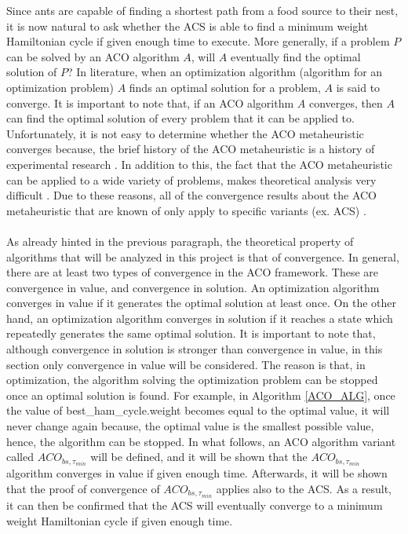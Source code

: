 \documentclass{article}
\begin{document}
Since ants are capable of finding a shortest path from a food source to their nest, it is now natural to ask whether the ACS is able to find a minimum weight Hamiltonian cycle if given enough time to execute. More generally, if a problem $P$ can be solved by an ACO algorithm $A$, will $A$ eventually find the optimal solution of $P$? In literature, when an optimization algorithm (algorithm for an optimization problem) $A$ finds an optimal solution for a problem, $A$ is said to converge. It is important to note that, if an ACO algorithm $A$ converges, then $A$ can find the optimal solution of every problem that it can be applied to. Unfortunately, it is not easy to determine whether the ACO metaheuristic converges because, the brief history of the ACO metaheuristic is a history of experimental research \cite{dorigo_stutzle_thomas_2004}. In addition to this, the fact that the ACO metaheuristic can be applied to a wide variety of problems, makes theoretical analysis very difficult \cite{dorigo_stutzle_thomas_2004}. Due to these reasons, all of the convergence results about the ACO metaheuristic that are known of only apply to specific variants (ex. ACS) \cite{dorigo_stutzle_thomas_2004}.\\\\
As already hinted in the previous paragraph, the theoretical property of algorithms that will be analyzed in this project is that of convergence. In general, there are at least two types of convergence in the ACO framework. These are convergence in value, and convergence in solution. An optimization algorithm converges in value if it generates the optimal solution at least once. On the other hand, an optimization algorithm converges in solution if it reaches a state which repeatedly generates the same optimal solution. It is important to note that, although convergence in solution is stronger than convergence in value, in this section only convergence in value will be considered. The reason is that, in optimization, the algorithm solving the optimization problem can be stopped once an optimal solution is found. For example, in Algorithm \ref{ACO_ALG}, once the value of best\_ham\_cycle.weight becomes equal to the optimal value, it will never change again because, the optimal value is the smallest possible value, hence, the algorithm can be stopped. In what follows, an ACO algorithm variant called $ACO_{bs, \tau_{min}}$ will be defined, and it will be shown that the $ACO_{bs, \tau_{min}}$ algorithm converges in value if given enough time. Afterwards, it will be shown that the proof of convergence of $ACO_{bs, \tau_{min}}$ applies also to the ACS. As a result, it can then be confirmed that the ACS will eventually converge to a minimum weight Hamiltonian cycle if given enough time. \cite{dorigo_stutzle_thomas_2004}\\\\
\end{document}
